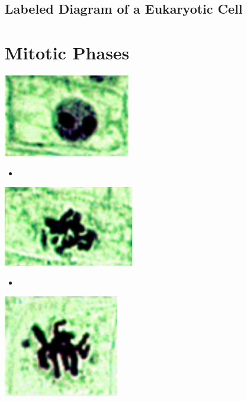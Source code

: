   \subsection{Labeled Diagram of a Eukaryotic Cell}
  \begin{figure}[h]
    \centering
    \def\svgwidth{\textwidth}
    
  \end{figure}


  \clearpage
  \section{Mitotic Phases}
  \begin{center}
    \includegraphics[scale=0.5]{images/week-1-mp1.png}
  \end{center}
  \begin{itemize}
    \item 
  \end{itemize}
  \begin{center}
    \includegraphics[scale=0.5]{images/week-1-mp2.png}
  \end{center}
  \begin{itemize}
    \item 
  \end{itemize}
  \begin{center}
    \includegraphics[scale=0.5]{images/week-1-mp3.png}
  \end{center}
